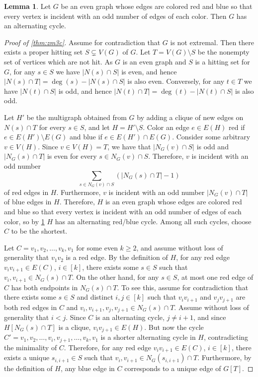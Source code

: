 \documentclass{amsart}
\theoremstyle{definition}
\newtheorem{lemma}[theorem]{Lemma}
\theoremstyle{remark}
\begin{document}
\begin{lemma}\cite[Corollary 2]{GH83}\label{lemma:altcyc}
    Let $G$ be an even graph whose edges are colored red and blue so that every vertex is incident with an odd number of edges of each color. Then $G$ has an alternating cycle.
\end{lemma}

\begin{proof}[Proof of \cref{thm:zm3c}]
    Assume for contradiction that $G$ is not extremal. Then there exists a proper hitting set $S\subsetneq V(G)$ of $G$. Let $T = V(G)\setminus S$ be the nonempty set of vertices which are not hit. As $G$ is an even graph and $S$ is a hitting set for $G$, for any $s\in S$ we have $|N(s)\cap S|$ is even, and hence $|N(s)\cap T| = \deg(s)-|N(s)\cap S|$ is also even. Conversely, for any $t\in T$ we have $|N(t)\cap S|$ is odd, and hence $|N(t)\cap T|=\deg(t)-|N(t)\cap S|$ is also odd.

    Let $H'$ be the multigraph obtained from $G$ by adding a clique of new edges on $N(s)\cap T$ for every $s\in S$, and let $H = H'\setminus S$. Color an edge $e\in E(H)$ red if $e\in E(H')\setminus E(G)$ and blue if $e \in E(H')\cap E(G)$. Consider some arbitrary $v\in V(H)$. Since $v\in V(H) = T$, we have that $|N_G(v)\cap S|$ is odd and $|N_G(s)\cap T|$ is even for every $s\in N_G(v)\cap S$. Therefore, $v$ is incident with an odd number
    \[
        \sum_{s\in N_G(v)\cap S}(|N_G(s)\cap T|-1)
    \]
    of red edges in $H$. Furthermore, $v$ is incident with an odd number $|N_G(v)\cap T|$ of blue edges in $H$. Therefore, $H$ is an even graph whose edges are colored red and blue so that every vertex is incident with an odd number of edges of each color, so by \cref{lemma:altcyc} $H$ has an alternating red/blue cycle. Among all such cycles, choose $C$ to be the shortest.

    Let $C = v_1,v_2,\dots,v_k,v_1$ for some even $k\ge 2$, and assume without loss of generality that $v_1v_2$ is a red edge. By the definition of $H$, for any red edge $v_iv_{i+1}\in E(C)$, $i\in[k]$, there exists some $s\in S$ such that $v_i,v_{i+1}\in N_G(s)\cap T$. On the other hand, for any $s\in S$, at most one red edge of $C$ has both endpoints in $N_G(s)\cap T$. To see this, assume for contradiction that there exists some $s\in S$ and distinct $i,j\in[k]$ such that $v_iv_{i+1}$ and $v_jv_{j+1}$ are both red edges in $C$ and $v_i, v_{i+1}, v_j, v_{j+1}\in N_G(s)\cap T$. Assume without loss of generality that $i < j$. Since $C$ is an alternating cycle, $j\neq i+1$, and since $H[N_G(s)\cap T]$ is a clique, $v_iv_{j+1}\in E(H)$. But now the cycle $C' = v_1,v_2,\dots,v_i,v_{j+1},\dots,v_k,v_1$ is a shorter alternating cycle in $H$, contradicting the minimality of $C$. Therefore, for any red edge $v_iv_{i+1}\in E(C)$, $i\in[k]$, there exists a unique $s_{i,i+1}\in S$ such that $v_i,v_{i+1}\in N_G(s_{i,i+1})\cap T$. Furthermore, by the definition of $H$, any blue edge in $C$ corresponds to a unique edge of $G[T]$. 
    

\end{proof}
\end{document}
